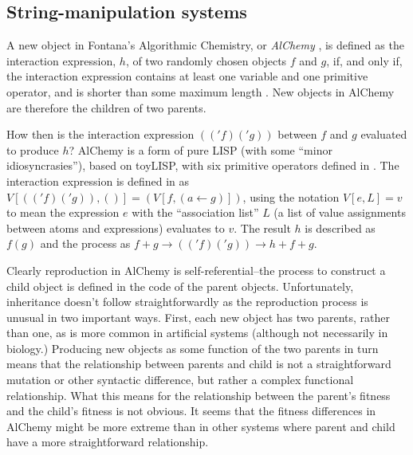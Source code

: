 \subsection{String-manipulation systems}

A new object in Fontana's Algorithmic Chemistry, or \emph{AlChemy} \parencite{Fontana1992}, is defined as the interaction expression, $h$, of two randomly chosen objects $f$ and $g$, if, and only if, the interaction expression contains at least one variable and one primitive operator, and is shorter than some maximum length \parencite[p.173--p.180]{Fontana1992}. New objects in AlChemy are therefore the children of two parents.

How then is the interaction expression $(('f)('g))$ between $f$ and $g$ evaluated to produce $h$? AlChemy is a form of pure LISP (with some ``minor idiosyncrasies''), based on toyLISP, with six primitive operators defined in \textcite[p.205]{Fontana1992}. The interaction expression is defined in \textcite[Definition A.9, p.204]{Fontana1992} as $V[(('f)('g)),()] = (V[f,(a\leftarrow g)])$, using the notation $V[e,L]=v$ to mean the expression $e$ with the ``association list'' $L$ (a list of value assignments between atoms and expressions) evaluates to $v$. The result $h$ is described as $f(g)$ and the process as $f+g \rightarrow (('f)('g)) \rightarrow h + f + g$.

Clearly reproduction in AlChemy is self-referential--the process to construct a child object is defined in the code of the parent objects. Unfortunately, inheritance doesn't follow straightforwardly as the reproduction process is unusual in two important ways. First, each new object has two parents, rather than one, as is more common in artificial systems (although not necessarily in biology.) Producing new objects as some function of the two parents in turn means that the relationship between parents and child is not a straightforward mutation or other syntactic difference, but rather a complex functional relationship. What this means for the relationship between the parent's fitness and the child's fitness is not obvious. It seems that the fitness differences in AlChemy might be more extreme than in other systems where parent and child have a more straightforward relationship.


